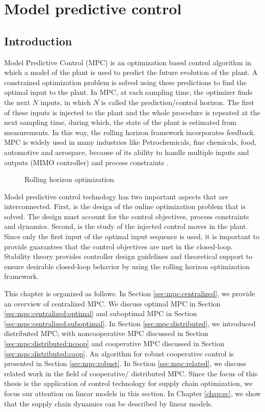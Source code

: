 \newcommand{\diag}{\text{diag}}
\chapter{Model predictive control}
\label{chap:mpc}

\section{Introduction}
Model Predictive Control (MPC) is an optimization based control
algorithm in which 
a model of the plant is used to predict the future evolution of the
plant. A constrained optimization problem is solved using these
predictions to find the optimal input to the plant. In MPC, at each
sampling time, the optimizer finds the next $N$ inputs, in which $N$
is called the prediction/control horizon. The first of these inputs is
injected to the plant and the whole procedure is repeated at the next
sampling time, during which, the state of the plant is estimated from
measurements. In this way, the rolling horizon framework incorporates
feedback. MPC is widely used in many industries like Petrochemicals,
fine chemicals, food, automotive and aerospace, because of its ability
to handle multiple inputs and outputs (MIMO controller) and process
constraints  \citep{qin:badgwell:2003}.

\begin{figure}
\centering
{\resizebox{0.5\textwidth}{!}{}}
\caption{Rolling horizon optimization.}
\label{fig:mpc:mpc_gen}
\end{figure}

Model predictive control technology has two important aspects that are
interconnected. First, is the design of the online optimization
problem that is solved. The design must account for the control
objectives, process constraints and dynamics. Second, is the study of the injected
control moves in the plant. Since only the first input of the optimal
input sequence is used, it is important to provide guarantees that the
control objectives are met in the closed-loop. Stability theory
provides controller design guidelines and theoretical support to
ensure desirable closed-loop behavior by using the rolling horizon
optimization framework.

This chapter is organized as follows. In Section
\ref{sec:mpc:centralized}, we provide an overview of centralized 
MPC. We discuss optimal MPC in Section
\ref{sec:mpc:centralized:optimal} and suboptimal MPC in Section
\ref{sec:mpc:centralized:suboptimal}. In Section
\ref{sec:mpc:distributed}, we introduced distributed MPC; with
noncooperative MPC discussed in Section
\ref{sec:mpc:distributed:ncoop} and cooperative MPC discussed in
Section \ref{sec:mpc:distributed:coop}. An algorithm for robust
cooperative control is presented in Section \ref{sec:mpc:robust}. In
Section \ref{sec:mpc:related}, we discuss related 
work in the field of cooperative/ distributed MPC.  
Since the focus of this thesis is the
application of control technology for supply chain optimization, we
focus our attention on linear models in this section. In Chapter
\ref{chap:sc}, we show that the supply chain dynamics can be described
by linear models. 

